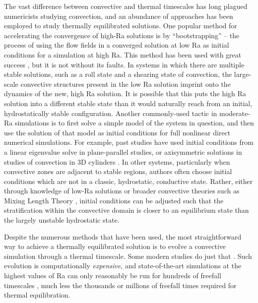 \documentclass[aps, pre, onecolumn, nofootinbib, notitlepage, groupedaddress, amsfonts, amssymb, amsmath, longbibliography]{revtex4-1}
\begin{document}
The vast difference between convective and thermal timescales has long plagued
numericists studying convection, and an abundance of approaches has been employed to
study thermally equilibrated solutions. One popular method for accelerating the convergence
of high-Ra solutions is by ``bootstrapping'' -- the process of using the flow
fields in a converged solution at low Ra as initial conditions for a simulation at high
Ra.  This method has been used with great success \cite{johnston&doering2009, verzicco&camussi1997},
but it is not without its faults.  In systems in which there are multiple
stable solutions, such as a roll state and a shearing state of convection,
the large-scale convective structures present in the
low Ra solution imprint onto the dynamics of the new, high Ra solution. 
It is possible that this puts the high Ra solution into a different stable state
than it would naturally reach from an initial, hydrostatically stable configuration.
Another commonly-used tactic in
moderate-Ra simulations is to first solve a simple model of the system in question,
and then use the solution of that model as initial conditions for full nonlinear
direct numerical simulations. For example, past studies have used initial conditions from
a linear eigenvalue solve \cite{hurlburt&all1984} in plane-parallel studies, or
axisymmetric solutions in studies of convection in 3D cylinders \cite{verzicco&camussi1997}. 
In other systems, particularly when convective zones are adjacent to stable regions,
authors often choose initial conditions which are not in a classic, hydrostatic,
conductive state. Rather, either through knowledge of low-Ra solutions \cite{couston&all2017}
or broader convective theories such as Mixing Length Theory
\cite{brandenburg&all2005}, initial conditions can be adjusted such that the stratification
within the convective domain is closer to an equilibrium state than the largely
unstable hydrostatic state.

Despite the numerous methods that have been used,
the most straightforward way to achieve a thermally equilibrated solution
is to evolve a convective simulation through a thermal timescale. Some modern
studies do just that \cite{featherstone&hindman2016}.
Such evolution is computationally 
\emph{expensive}, and state-of-the-art simulations at the highest values of Ra
can only reasonably be run
for hundreds of freefall timescales \cite{stevens&all2011}, much less the
thousands or millions of freefall times required for thermal equilibration.
\end{document}
